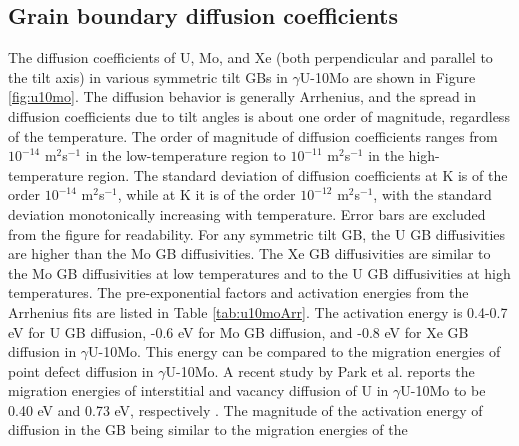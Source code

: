 \documentclass{elsarticle}
\providecommand{\DIFadd}[1]{{\protect\color{blue} \sf #1}} %
\providecommand{\DIFdel}[1]{}
\providecommand{\DIFaddbegin}{} %
\providecommand{\DIFaddend}{} %
\providecommand{\DIFdelbegin}{} %
\providecommand{\DIFdelend}{} %
\begin{document}
\FloatBarrier
\subsection{\DIFdelbegin \DIFdel{Total }\DIFdelend \DIFaddbegin \DIFadd{Grain boundary }\DIFaddend diffusion coefficients}

The \DIFdelbegin \DIFdel{total }\DIFdelend diffusion coefficients of \DIFaddbegin \DIFadd{U, Mo, and Xe (both perpendicular and parallel to the tilt axis) in }\DIFaddend various symmetric tilt GBs in $\gamma$U-10Mo are shown in Figure \ref{fig:u10mo}\DIFdelbegin \DIFdel{(a)}\DIFdelend . The diffusion behavior is generally Arrhenius, and the spread in diffusion coefficients due to tilt angles is \DIFdelbegin \DIFdel{within }\DIFdelend \DIFaddbegin \DIFadd{about }\DIFaddend one order of magnitude, regardless of the temperature. The order of magnitude of diffusion coefficients ranges from \DIFdelbegin \DIFdel{$10^{-11}$ }\DIFdelend \DIFaddbegin \DIFadd{$10^{-14}$ }\DIFaddend m$^2$s$^{-1}$ in the \DIFdelbegin \DIFdel{high-temperature region to $10^{-12}$ }\DIFdelend \DIFaddbegin \DIFadd{low-temperature region to $10^{-11}$ }\DIFaddend m$^2$s$^{-1}$ in the \DIFdelbegin \DIFdel{low-temperature }\DIFdelend \DIFaddbegin \DIFadd{high-temperature }\DIFaddend region. The standard deviation of diffusion coefficients at \DIFdelbegin \DIFdel{1200 K is around $10^{-12}$ }\DIFdelend \DIFaddbegin \DIFadd{600 K is of the order $10^{-14}$ }\DIFaddend m$^2$s$^{-1}$\DIFdelbegin \DIFdel{on average}\DIFdelend , while at \DIFdelbegin \DIFdel{600 }\DIFdelend \DIFaddbegin \DIFadd{1200 }\DIFaddend K it is \DIFdelbegin \DIFdel{around $10^{-13}$ }\DIFdelend \DIFaddbegin \DIFadd{of the order $10^{-12}$ }\DIFaddend m$^2$s$^{-1}$\DIFdelbegin \DIFdel{on average}\DIFdelend , with the standard deviation monotonically increasing with temperature. Error bars are excluded from the figure for readability. \DIFdelbegin \DIFdel{The }\DIFdelend \DIFaddbegin \DIFadd{For any symmetric tilt GB, the U GB diffusivities are higher than the Mo GB diffusivities. The Xe GB diffusivities are similar to the Mo GB diffusivities at low temperatures and to the U GB diffusivities at high temperatures. The }\DIFaddend pre-exponential factors and activation energies from the Arrhenius fits are listed in Table \ref{tab:u10moArr}. The \DIFdelbegin \DIFdel{table lists values }\DIFdelend \DIFaddbegin \DIFadd{activation energy is 0.4-0.7 eV }\DIFaddend for U GB diffusion, \DIFaddbegin \DIFadd{0.4-0.6 eV for }\DIFaddend Mo GB diffusion, and \DIFdelbegin \DIFdel{total GB diffusion. The activation energy for total diffusion is about 0.2-0.3 eV for the examined GBs }\DIFdelend \DIFaddbegin \DIFadd{0.5-0.8 eV for Xe GB diffusion }\DIFaddend in $\gamma$U-10Mo. This energy can be compared to the migration energies of point defect diffusion in $\gamma$U-10Mo. A recent study by Park et al. reports the migration energies of interstitial and vacancy diffusion of U in $\gamma$U-10Mo to be 0.40 eV and 0.73 eV, respectively \cite{park2023}. The \DIFaddbegin \DIFadd{magnitude of the }\DIFaddend activation energy of diffusion in the GB being \DIFdelbegin \DIFdel{lower than }\DIFdelend \DIFaddbegin \DIFadd{similar to }\DIFaddend the migration energies of \DIFaddbegin \DIFadd{the }\DIFaddend 
\end{document}
